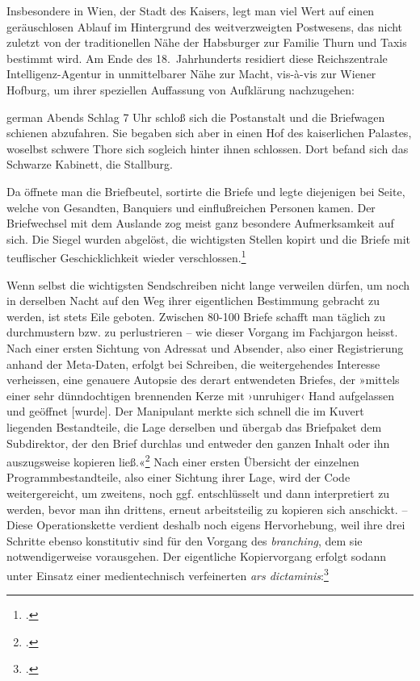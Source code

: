 \documentclass[a4paper,11pt]{article}
\newcommand{\anf}[1]{»#1«}
\newcommand{\inanf}[1]{›#1‹}
\newenvironment{zitat}{
\begin{foreigndisplayquote}{german}}%
{\end{foreigndisplayquote}}
\begin{document}
Insbesondere in Wien, der Stadt des Kaisers, legt man viel Wert auf einen geräuschlosen Ablauf im Hintergrund des weitverzweigten Postwesens, das nicht zuletzt von der traditionellen Nähe der Habsburger zur Familie Thurn und Taxis bestimmt wird. Am Ende des 18.~Jahrhunderts residiert diese Reichszentrale Intelligenz-Agentur in unmittelbarer Nähe zur Macht, vis-à-vis zur Wiener Hofburg, um ihrer speziellen Auffassung von Aufklärung nachzugehen:
\begin{zitat}
Abends Schlag 7 Uhr schloß sich die Postanstalt und die Briefwagen schienen abzufahren. Sie begaben sich aber in einen Hof des kaiserlichen Palastes, woselbst schwere Thore sich sogleich hinter ihnen schlossen. Dort befand sich das Schwarze Kabinett, die Stallburg.

Da öffnete man die Briefbeutel, sortirte die Briefe und legte diejenigen bei Seite, welche von Gesandten, Banquiers und einflußreichen Personen kamen. Der Briefwechsel mit dem Auslande zog meist ganz besondere Aufmerksamkeit auf sich. Die Siegel wurden abgelöst, die wichtigsten Stellen kopirt und die Briefe mit teuflischer Geschicklichkeit wieder verschlossen.\footcite[40]{koenig:1875}
\end{zitat}
Wenn selbst die wichtigsten Sendschreiben nicht lange verweilen dürfen, um noch in derselben Nacht auf den Weg ihrer eigentlichen Bestimmung gebracht zu werden, ist stets Eile geboten. Zwischen 80-100 Briefe schafft man täglich zu durchmustern bzw. zu perlustrieren – wie dieser Vorgang im Fachjargon heisst. Nach einer ersten Sichtung von Adressat und Absender, also einer Registrierung anhand der Meta-Daten, erfolgt bei Schreiben, die weitergehendes Interesse verheissen, eine genauere Autopsie des derart entwendeten Briefes, der \anf{mittels einer sehr dünndochtigen brennenden Kerze mit \inanf{unruhiger} Hand aufgelassen und geöffnet [wurde]. Der Manipulant merkte sich schnell die im Kuvert liegenden Bestandteile, die Lage derselben und übergab das Briefpaket dem Subdirektor, der den Brief durchlas und entweder den ganzen Inhalt oder ihn auszugsweise kopieren ließ.}\footcite[138]{stix:1937} Nach einer ersten Übersicht der einzelnen Programmbestandteile, also einer Sichtung ihrer Lage, wird der Code weitergereicht, um zweitens, noch ggf. entschlüsselt und dann interpretiert zu werden, bevor man ihn drittens, erneut arbeitsteilig zu kopieren sich anschickt. – Diese Operationskette verdient deshalb noch eigens Hervorhebung, weil ihre drei Schritte ebenso konstitutiv sind für den Vorgang des \emph{branching}, dem sie notwendigerweise vorausgehen. Der eigentliche Kopiervorgang erfolgt sodann unter Einsatz einer medientechnisch verfeinerten \emph{ars dictaminis}:\footcite[Vgl. dazu][]{krautter:1982}
\end{document}
